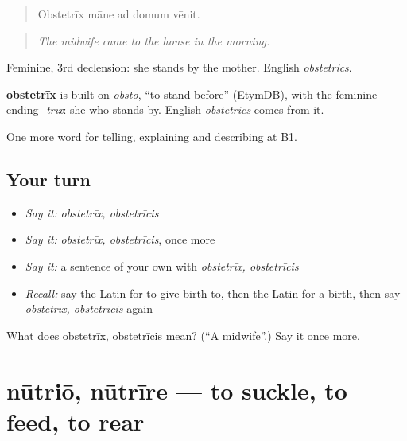 \begin{quote}
Obstetrīx māne ad domum vēnit.
\end{quote}

\begin{quote}
\emph{The midwife came to the house in the morning.}
\end{quote}

Feminine, 3rd declension: she stands by the mother. English \emph{obstetrics}.

\begin{cousinweb}
\textbf{obstetrīx} is built on \emph{obstō}, \textquotedblleft{}to stand before\textquotedblright{} (EtymDB), with the feminine ending \emph{-trīx}: she who stands by. English \emph{obstetrics} comes from it.
\end{cousinweb}

\begin{grammarlens}[title={What you've built}]
One more word for telling, explaining and describing at B1.
\end{grammarlens}

\subsection*{Your turn}
\begin{itemize}
\raggedright
  \item \emph{Say it:} \emph{obstetrīx, obstetrīcis}
  \item \emph{Say it:} \emph{obstetrīx, obstetrīcis}, once more
  \item \emph{Say it:} a sentence of your own with \emph{obstetrīx, obstetrīcis}
  \item \emph{Recall:} say the Latin for to give birth to, then the Latin for a birth, then say \emph{obstetrīx, obstetrīcis} again
\end{itemize}

\begin{tcolorbox}[breakable,colback=teal!4,colframe=teal!35!black,title={Before you move on}]
What does obstetrīx, obstetrīcis mean? (\textquotedblleft{}A midwife\textquotedblright{}.) Say it once more.
\end{tcolorbox}
\section[nūtriō, nūtrīre]{nūtriō, nūtrīre — to suckle, to feed, to rear}

\label{lesson:LA-C323-nutrio}



